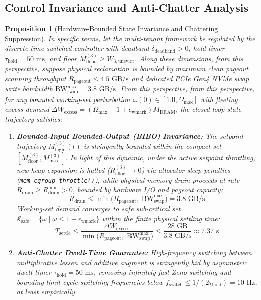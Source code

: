 \documentclass[pdflatex,sn-mathphys,Numbered]{sn-jnl}
\newtheorem{proposition}{Proposition}
\begin{document}
\subsection{Control Invariance and Anti-Chatter Analysis}
\begin{proposition}[Hardware-Bounded State Invariance and Chattering Suppression]
\label{prop:stability}
In specific terms, let the multi-tenant framework be regulated by the discrete-time switched controller with deadband $\delta_{\text{deadband}} > 0$, hold timer $\tau_{\text{hold}} = 50\text{ ms}$, and floor $M_{\text{floor}}^{(3)} \ge W_{3,\text{unevict}}$. Along these dimensions, from this perspective, suppose physical reclamation is bounded by maximum clean pageout scanning throughput $R_{\text{pageout}} \le 4.5\text{ GB/s}$ and dedicated PCIe Gen4 NVMe swap write bandwidth $\text{BW}_{\text{swap}}^{\text{max}} = 3.8\text{ GB/s}$. From this perspective, from this perspective, for any bounded working-set perturbation $\omega(0) \in [1.0, \Omega_{\text{max}}]$ with fleeting excess demand $\Delta W_{\text{excess}} = (\Omega_{\text{max}} - 1 + \epsilon_{\text{wmark}}) M_{\text{DRAM}}$, the closed-loop state trajectory satisfies:
\begin{enumerate}
    \item \textbf{Bounded-Input Bounded-Output (BIBO) Invariance:} The setpoint trajectory $M_{\text{high}}^{(3)}(t)$ is stringently bounded within the compact set $[M_{\text{floor}}^{(3)}, M_{\text{max}}^{(3)}]$. In light of this dynamic, under the active setpoint throttling, new heap expansion is halted ($R_{\text{alloc}}^{(3)} \to 0$) via allocator sleep penalties (\texttt{mem\_cgroup\_throttle()}), while physical memory drain proceeds at rate $R_{\text{drain}} \ge R_{\text{drain}}^{\text{min}} > 0$, bounded by hardware I/O and pageout capacity:
    \begin{equation}
    R_{\text{drain}} \le \min\big(R_{\text{pageout}}, \; \text{BW}_{\text{swap}}^{\text{max}}\big) = 3.8\text{ GB/s}
    \label{eq:r_drain_bound}
    \end{equation}
    Working-set demand converges to safe sub-critical set $\mathcal{S}_{\text{safe}} = \{\omega \mid \omega \le 1 - \epsilon_{\text{wmark}}\}$ within the finite physical settling time:
    \begin{equation}
    T_{\text{settle}} \le \frac{\Delta W_{\text{excess}}}{\min\big(R_{\text{pageout}}, \; \text{BW}_{\text{swap}}^{\text{max}}\big)} \le \frac{28\text{ GB}}{3.8\text{ GB/s}} \approx 7.37\text{ s}
    \label{eq:t_settle}
    \end{equation}
    \item \textbf{Anti-Chatter Dwell-Time Guarantee:} High-frequency switching between multiplicative lessen and additive augment is stringently hid by asymmetric dwell timer $\tau_{\text{hold}} = 50\text{ ms}$, removing infinitely fast Zeno switching and bounding limit-cycle switching frequencies below $f_{\text{switch}} \le 1 / (2\tau_{\text{hold}}) = 10\text{ Hz}$, at least empirically.
\end{enumerate}
\end{proposition}
\end{document}

